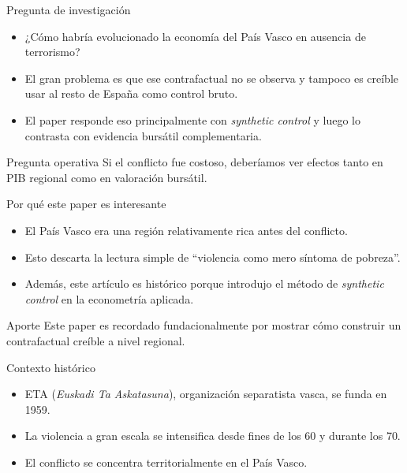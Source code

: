 \documentclass[aspectratio=1610]{beamer}
\begin{document}
\begin{frame}{Pregunta de investigación}
    \begin{itemize}
        \item ¿Cómo habría evolucionado la economía del País Vasco en ausencia de terrorismo?
        \item El gran problema es que ese contrafactual no se observa y tampoco es creíble usar al resto de España como control bruto.
        \item El paper responde eso principalmente con \emph{synthetic control} y luego lo contrasta con evidencia bursátil complementaria.
    \end{itemize}
    \begin{alertblock}{Pregunta operativa}
        Si el conflicto fue costoso, deberíamos ver efectos tanto en PIB regional como en valoración bursátil.
    \end{alertblock}
\end{frame}

\begin{frame}{Por qué este paper es interesante}
    \begin{itemize}
        \item El País Vasco era una región relativamente rica antes del conflicto.
        \item Esto descarta la lectura simple de ``violencia como mero síntoma de pobreza''.
        \item Además, este artículo es histórico porque introdujo el método de \emph{synthetic control} en la econometría aplicada.
    \end{itemize}
    \begin{block}{Aporte}
        Este paper es recordado fundacionalmente por mostrar cómo construir un contrafactual creíble a nivel regional.
    \end{block}
\end{frame}

\begin{frame}{Contexto histórico}
    \begin{itemize}
        \item ETA (\emph{Euskadi Ta Askatasuna}), organización separatista vasca, se funda en 1959.
        \item La violencia a gran escala se intensifica desde fines de los 60 y durante los 70.
        \item El conflicto se concentra territorialmente en el País Vasco.
    \end{itemize}
\end{frame}
\end{document}
